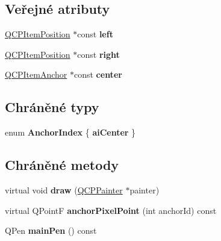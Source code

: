 \subsection*{Veřejné atributy}
\begin{DoxyCompactItemize}
\item 
\hypertarget{classQCPItemBracket_af6cc6d27d96171778c6927d6edce48b0}{}\hyperlink{classQCPItemPosition}{Q\+C\+P\+Item\+Position} $\ast$const {\bfseries left}\label{classQCPItemBracket_af6cc6d27d96171778c6927d6edce48b0}

\item 
\hypertarget{classQCPItemBracket_afa6c1360b05a50c4e0df37b3cebab6be}{}\hyperlink{classQCPItemPosition}{Q\+C\+P\+Item\+Position} $\ast$const {\bfseries right}\label{classQCPItemBracket_afa6c1360b05a50c4e0df37b3cebab6be}

\item 
\hypertarget{classQCPItemBracket_a2dbcabdf5f467f28be12a7b25962ffca}{}\hyperlink{classQCPItemAnchor}{Q\+C\+P\+Item\+Anchor} $\ast$const {\bfseries center}\label{classQCPItemBracket_a2dbcabdf5f467f28be12a7b25962ffca}

\end{DoxyCompactItemize}
\subsection*{Chráněné typy}
\begin{DoxyCompactItemize}
\item 
\hypertarget{classQCPItemBracket_a7f3a6a56d67f71219ed220553f3dd861}{}enum {\bfseries Anchor\+Index} \{ {\bfseries ai\+Center}
 \}\label{classQCPItemBracket_a7f3a6a56d67f71219ed220553f3dd861}

\end{DoxyCompactItemize}
\subsection*{Chráněné metody}
\begin{DoxyCompactItemize}
\item 
\hypertarget{classQCPItemBracket_a8343cf0559c64886add7aa7f4b22f1a6}{}virtual void {\bfseries draw} (\hyperlink{classQCPPainter}{Q\+C\+P\+Painter} $\ast$painter)\label{classQCPItemBracket_a8343cf0559c64886add7aa7f4b22f1a6}

\item 
\hypertarget{classQCPItemBracket_ac76827e3acba5faee81f149af4047a39}{}virtual Q\+Point\+F {\bfseries anchor\+Pixel\+Point} (int anchor\+Id) const \label{classQCPItemBracket_ac76827e3acba5faee81f149af4047a39}

\item 
\hypertarget{classQCPItemBracket_a8df4ad873bf88a4a7bfb9bbbd490e495}{}Q\+Pen {\bfseries main\+Pen} () const \label{classQCPItemBracket_a8df4ad873bf88a4a7bfb9bbbd490e495}

\end{DoxyCompactItemize}
